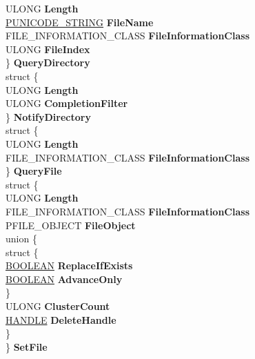 \begin{DoxyCompactItemize}
\begin{tabbing}
\>\>ULONG {\bfseries Length}\\
\>\>\hyperlink{struct___u_n_i_c_o_d_e___s_t_r_i_n_g}{PUNICODE\_STRING} {\bfseries FileName}\\
\>\>FILE\_INFORMATION\_CLASS {\bfseries FileInformationClass}\\
\>\>ULONG {\bfseries FileIndex}\\
\>\} {\bfseries QueryDirectory}\\
\>struct \{\\
\>\>ULONG {\bfseries Length}\\
\>\>ULONG {\bfseries CompletionFilter}\\
\>\} {\bfseries NotifyDirectory}\\
\>struct \{\\
\>\>ULONG {\bfseries Length}\\
\>\>FILE\_INFORMATION\_CLASS {\bfseries FileInformationClass}\\
\>\} {\bfseries QueryFile}\\
\>struct \{\\
\>\>ULONG {\bfseries Length}\\
\>\>FILE\_INFORMATION\_CLASS {\bfseries FileInformationClass}\\
\>\>PFILE\_OBJECT {\bfseries FileObject}\\
\mbox{\label{struct___e_x_t_e_n_d_e_d___i_o___s_t_a_c_k___l_o_c_a_t_i_o_n_1_1_0D2043_1_1_0D2052_a48c0765a939ec47c9e6df6d6b6b16cec}} 
\>\>union \{\\
\mbox{\label{union___e_x_t_e_n_d_e_d___i_o___s_t_a_c_k___l_o_c_a_t_i_o_n_1_1_0D2043_1_1_0D2052_1_1_0D2082_ab2247372c4b1c0750e79004942e28cd3}} 
\>\>\>struct \{\\
\>\>\>\>\hyperlink{_processor_bind_8h_a112e3146cb38b6ee95e64d85842e380a}{BOOLEAN} {\bfseries ReplaceIfExists}\\
\>\>\>\>\hyperlink{_processor_bind_8h_a112e3146cb38b6ee95e64d85842e380a}{BOOLEAN} {\bfseries AdvanceOnly}\\
\>\>\>\} \\
\>\>\>ULONG {\bfseries ClusterCount}\\
\>\>\>\hyperlink{interfacevoid}{HANDLE} {\bfseries DeleteHandle}\\
\>\>\} \\
\>\} {\bfseries SetFile}\\

\end{tabbing}
\end{DoxyCompactItemize}
